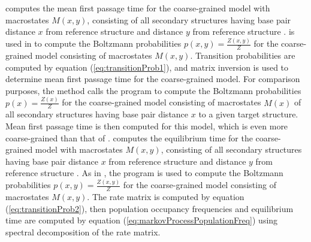 \fftmfpt computes the mean first passage time
for the coarse-grained model with macrostates $M(x,y)$, consisting of
all secondary structures having base pair distance $x$ from reference
structure \strA and distance $y$ from reference structure \strB.
\ffttwo is used in \hermes to compute the Boltzmann probabilities
$p(x,y) = \frac{Z(x,y)}{Z}$ for the coarse-grained model consisting of
macrostates $M(x,y)$. Transition probabilities are computed by
equation (\ref{eq:transitionProb1}), and matrix inversion is used to
determine mean first passage time for the coarse-grained model.
For comparison purposes, the method \fftbor calls the
program \fftbor \citep{Senter.po12} to compute the Boltzmann probabilities
$p(x) = \frac{Z(x)}{Z}$ for the coarse-grained model consisting of
macrostates $M(x)$ of all secondary structures having base pair distance
$x$ to a given target structure. Mean first passage time is then computed
for this model, which is even more coarse-grained than that of \fftmfpt.
\ffteq computes the equilibrium time
for the coarse-grained model with macrostates $M(x,y)$, consisting of
all secondary structures having base pair distance $x$ from reference
structure \strA and distance $y$ from reference structure \strB. As in
\fftmfpt, the program
\ffttwo is used to compute the Boltzmann probabilities
$p(x,y) = \frac{Z(x,y)}{Z}$ for the coarse-grained model consisting of
macrostates $M(x,y)$. The rate matrix is computed by
equation (\ref{eq:transitionProb2}), then population occupancy
frequencies and equilibrium time
are computed by equation (\ref{eq:markovProcessPopulationFreq})
using spectral decomposition of the rate matrix.


